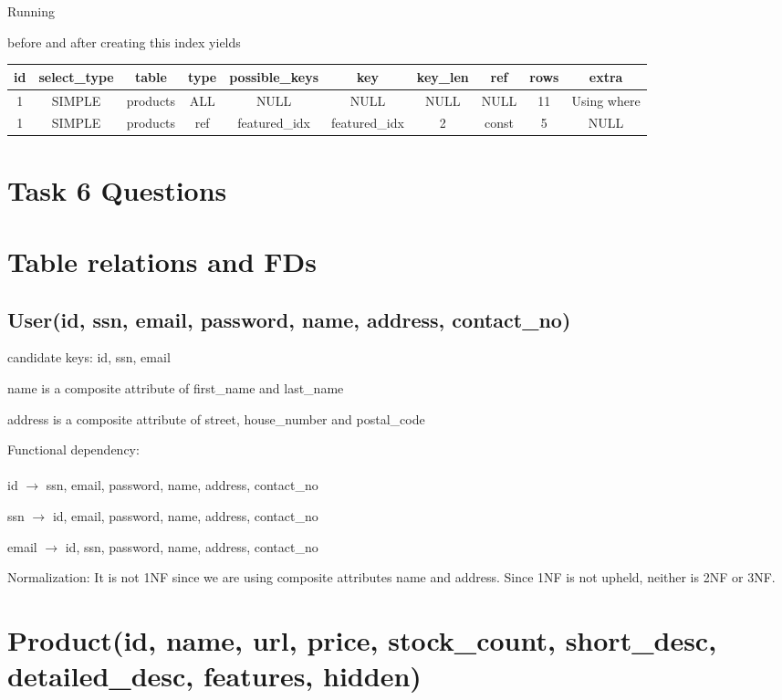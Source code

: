\documentclass{article}
\newcommand{\sql}[1]{}
\begin{document}
Running
\sql{explain}
before and after creating this index yields\\
\begin{tabular}{ | c c c c c c c c c c | }
  \hline
  id & select\_type & table & type & possible\_keys & key & key\_len & ref & rows & extra\\
  \hline
  1 & SIMPLE & products & ALL & NULL & NULL & NULL & NULL & 11 & Using where\\
  1 & SIMPLE & products & ref & featured\_idx & featured\_idx & 2 & const & 5 & NULL\\
  \hline
\end{tabular}

\section*{Task 6 Questions}

\section{Table relations and FDs}

\subsection{User(id, ssn, email, password, name, address, contact\_no)}

candidate keys: {id}, {ssn}, {email}

name is a composite attribute of first\_name and last\_name



address is a composite attribute of street, house\_number and postal\_code


Functional dependency:\\\\

id $\rightarrow$ ssn, email, password, name, address, contact\_no

ssn $\rightarrow$ id, email, password, name, address, contact\_no

email $\rightarrow$ id, ssn, password, name, address, contact\_no

Normalization: It is not 1NF since we are using composite attributes name and address. Since 1NF is not upheld, neither is 2NF or 3NF.



\section{Product(id, name, url, price, stock\_count, short\_desc, detailed\_desc, features, hidden)}
\end{document}
